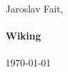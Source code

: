   \author{Jaroslav Fait}   
%  

  \begin{titlepage}
    \frontmatter %
    \vspace*{3cm} 
    \centering
    \textsf{\large Jaroslav Fait,  }\\[1cm]
    \HRule \\[0.4cm] 
    \textbf{\Huge Wiking}\\[0.1cm]
    \HRule \\[1.4cm]
    \today
    \vfill
    \vspace*{1cm}
  \end{titlepage}